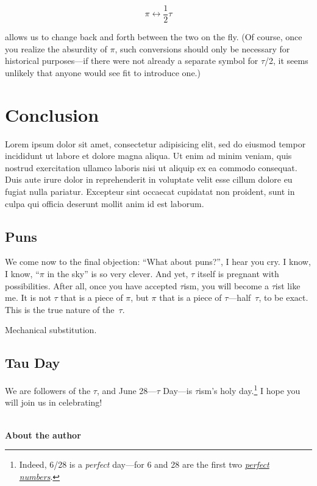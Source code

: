 \documentclass{article}
\begin{document}
\[
  \pi \leftrightarrow \textstyle{\frac{1}{2}}\tau
\]

\noindent allows us to change back and forth between the two on the fly. (Of course, once you realize the absurdity of $\pi$, such conversions should only be necessary for historical purposes---if there were not already a separate symbol for $\tau$/2, it seems unlikely that anyone would see fit to introduce one.)


\section{Conclusion}

Lorem ipsum dolor sit amet, consectetur adipisicing elit, sed do eiusmod tempor incididunt ut labore et dolore magna aliqua. Ut enim ad minim veniam, quis nostrud exercitation ullamco laboris nisi ut aliquip ex ea commodo consequat. Duis aute irure dolor in reprehenderit in voluptate velit esse cillum dolore eu fugiat nulla pariatur. Excepteur sint occaecat cupidatat non proident, sunt in culpa qui officia deserunt mollit anim id est laborum.

\subsection{Puns}

We come now to the final objection: ``What about puns?'', I hear you cry. I know, I know, ``$\pi$ in the sky'' is so very clever. And yet, $\tau$ itself is pregnant with possibilities. After all, once you have accepted $\tau$ism, you will become a $\tau$ist like me. It is not $\tau$ that is a piece of $\pi$, but $\pi$ that is a piece of $\tau$---half~$\tau$, to be exact. This is the true nature of the~$\tau$.

Mechanical substitution.

\subsection{Tau Day} %
\label{sec:tau_day}


We are followers of the $\tau$, and June 28---$\tau$ Day---is $\tau$ism's holy day.\footnote{Indeed, 6/28 is a \emph{perfect} day---for 6 and 28 are the first two \href{http://en.wikipedia.org/wiki/Perfect_number}{\emph{perfect numbers}}.} I hope you will join us in celebrating!

\\

\textbf{About the author}
\end{document}
